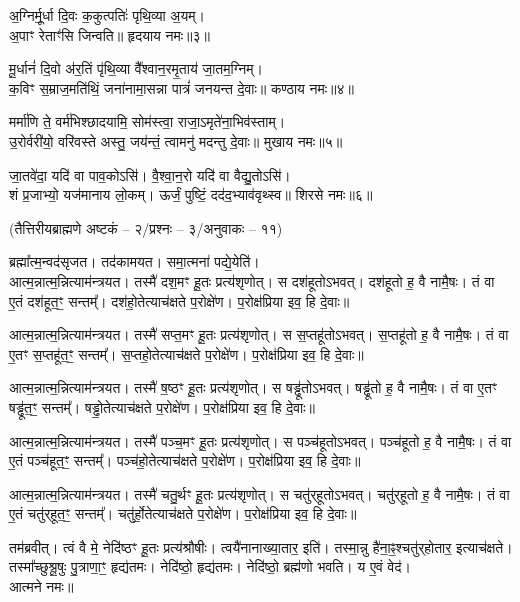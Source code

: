 अ॒ग्निर्मू॒र्धा दि॒वः क॒कुत्पतिः॑ पृथि॒व्या अ॒यम्।\\
अ॒पाꣳ रेताꣳ॑सि जिन्वति॥ हृदयाय नमः॥३॥

मू॒र्धानं॑ दि॒वो अ॑र॒तिं पृ॑थि॒व्या वै᳚श्वान॒रमृ॒ताय॑ जा॒तम॒ग्निम्।\\
क॒विꣳ स॒म्राज॒मति॑थिं॒ जना॑नामा॒सन्ना पात्रं॑ जनयन्त दे॒वाः॥ कण्ठाय नमः॥४॥

मर्मा॑णि ते॒ वर्म॑भिश्छादयामि॒ सोम॑स्त्वा॒ राजा॒ऽमृते॑ना॒भि\-व॑स्ताम्।\\
उ॒रोर्वरी॑यो॒ वरि॑वस्ते अस्तु॒ जय॑न्तं॒ त्वामनु॑ मदन्तु दे॒वाः॥ मुखाय नमः॥५॥

जा॒तवे॑दा॒ यदि॑ वा पाव॒कोऽसि॑। वै॒श्वा॒न॒रो यदि॑ वा वैद्यु॒तोऽसि॑।\\
शं प्र॒जाभ्यो॒ यज॑मानाय लो॒कम्। ऊर्जं॒ पुष्टिं॒ दद॑द॒भ्याव॑वृथ्स्व॥ शिरसे नमः॥६॥

{\small\closesection}

\centerline{\scriptsize (तैत्तिरीयब्राह्मणे अष्टकं – २/प्रश्नः – ३/अनुवाकः – ११)}

ब्रह्मा᳚त्म॒न्वद॑सृजत। तद॑कामयत। समा॒त्मना॑ पद्ये॒येति॑।\\
आत्म॒न्नात्म॒न्नित्याम॑न्त्रयत। तस्मै॑ दश॒मꣳ हू॒तः प्रत्य॑शृणोत्। स दश॑हूतोऽभवत्। दश॑हूतो ह॒ वै नामै॒षः। तं वा ए॒तं दश॑हूत॒ꣳ॒ सन्तम्᳚। दश॑हो॒तेत्याच॑क्षते प॒रोक्षे॑ण। प॒रोक्ष॑प्रिया इव॒ हि दे॒वाः॥

आत्म॒न्नात्म॒न्नित्याम॑न्त्रयत। तस्मै॑ सप्त॒मꣳ हू॒तः प्रत्य॑शृणोत्। स स॒प्तहू॑तोऽभवत्। स॒प्तहू॑तो ह॒ वै नामै॒षः। तं वा ए॒तꣳ स॒प्तहू॑त॒ꣳ॒ सन्तम्᳚। स॒प्तहो॒तेत्याच॑क्षते प॒रोक्षे॑ण। प॒रोक्ष॑प्रिया इव॒ हि दे॒वाः॥

आत्म॒न्नात्म॒न्नित्याम॑न्त्रयत। तस्मै॑ ष॒ष्ठꣳ हू॒तः प्रत्य॑शृणोत्। स षड्ढू॑तोऽभवत्। षड्ढू॑तो ह॒ वै नामै॒षः। तं वा ए॒तꣳ षड्ढू॑त॒ꣳ॒ सन्तम्᳚। षड्ढो॒तेत्याच॑क्षते प॒रोक्षे॑ण। प॒रोक्ष॑प्रिया इव॒ हि दे॒वाः॥

आत्म॒न्नात्म॒न्नित्याम॑न्त्रयत। तस्मै॑ पञ्च॒मꣳ हू॒तः प्रत्य॑शृणोत्। स पञ्च॑हूतोऽभवत्। पञ्च॑हूतो ह॒ वै नामै॒षः। तं वा ए॒तं पञ्च॑हूत॒ꣳ॒ सन्तम्᳚। पञ्च॑हो॒तेत्याच॑क्षते प॒रोक्षे॑ण। प॒रोक्ष॑प्रिया इव॒ हि दे॒वाः॥

आत्म॒न्नात्म॒न्नित्याम॑न्त्रयत। तस्मै॑ चतु॒र्थꣳ हू॒तः प्रत्य॑शृणोत्। स चतु॑र्‌हूतोऽभवत्। चतु॑र्‌हूतो ह॒ वै नामै॒षः। तं वा ए॒तं चतु॑र्‌हूत॒ꣳ॒ सन्तम्᳚। चतु॑र्हो॒तेत्याच॑क्षते प॒रोक्षे॑ण। प॒रोक्ष॑प्रिया इव॒ हि दे॒वाः॥

तम॑ब्रवीत्। त्वं वै मे॒ नेदि॑ष्ठꣳ हू॒तः प्रत्य॑श्रौषीः। त्वयै॑नानाख्या॒तार॒ इति॑। तस्मा॒न्नु है॑ना॒ꣴ॒श्चतु॑र्‌होतार॒ इत्याच॑क्षते। तस्मा᳚च्छुश्रू॒षुः पु॒त्राणा॒ꣳ॒ हृद्य॑तमः। नेदि॑ष्ठो॒ हृद्य॑तमः। नेदि॑ष्ठो॒ ब्रह्म॑णो भवति। य ए॒वं वेद॑।\\
आत्मने नमः॥

